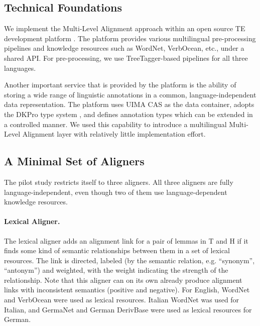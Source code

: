 \documentclass[11pt,letterpaper]{article}
\begin{document}

\subsection{Technical Foundations}  
\label{sec:techn-found}

We implement the Multi-Level Alignment approach within an open source
TE development platform \cite{EOP-arch}. The platform provides various
multilingual pre-processing pipelines and knowledge resources such as
WordNet, VerbOcean, etc., under a shared API. For pre-processing, we
use TreeTagger-based pipelines for all three languages.

Another important service that is provided by the platform is the
ability of storing a wide range of linguistic annotations in a common,
language-independent data representation. The platform uses UIMA CAS
\cite{d04:_uima} as the data container, adopts the DKPro type system
\cite{DKpro}, and defines annotation types which can be extended in a
controlled manner. We used this capability to introduce a multilingual
Multi-Level Alignment layer %
with relatively little implementation effort.

\subsection{A Minimal Set of Aligners}

The pilot study restricts itself to three aligners.  
All three aligners are fully language-independent, even though two of
them use language-dependent knowledge resources. 

\paragraph{Lexical Aligner.} The lexical aligner adds an alignment link
for a pair of lemmas in T and H if it finds some kind of semantic
relationships between them in a set of lexical resources. The link is
directed, labeled (by the semantic relation, e.g. ``synonym'',
``antonym'') and weighted, with the weight indicating the strength of
the relationship. Note that this aligner can on its own already
produce alignment links with inconsistent semantics (positive and
negative). For English, WordNet and VerbOcean were used as lexical
resources. Italian WordNet was used for Italian, and GermaNet and
German DerivBase \cite{Zeller:2013} were used as lexical resources for
German.
\end{document}
